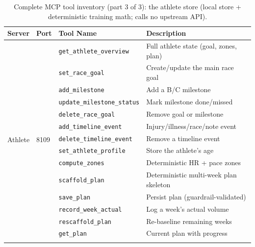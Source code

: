 \begin{table}[ht]
\begin{center}
\begin{minipage}{\textwidth}
\caption[Complete MCP tool inventory (3/3)]{Complete MCP tool inventory (part 3 of 3): the athlete store (local store + deterministic training math; calls no upstream API).}\label{tab:full_tools_c}
\begin{tabularx}{\textwidth}{lllX}
\toprule
\textbf{Server} & \textbf{Port} & \textbf{Tool Name} & \textbf{Description} \\
\midrule
\multirow{14}{*}{Athlete} & \multirow{14}{*}{8109}
  & \texttt{get\_athlete\_overview} & Full athlete state (goal, zones, plan) \\
  & & \texttt{set\_race\_goal} & Create/update the main race goal \\
  & & \texttt{add\_milestone} & Add a B/C milestone \\
  & & \texttt{update\_milestone\_status} & Mark milestone done/missed \\
  & & \texttt{delete\_race\_goal} & Remove goal or milestone \\
  & & \texttt{add\_timeline\_event} & Injury/illness/race/note event \\
  & & \texttt{delete\_timeline\_event} & Remove a timeline event \\
  & & \texttt{set\_athlete\_profile} & Store the athlete's age \\
  & & \texttt{compute\_zones} & Deterministic HR + pace zones \\
  & & \texttt{scaffold\_plan} & Deterministic multi-week plan skeleton \\
  & & \texttt{save\_plan} & Persist plan (guardrail-validated) \\
  & & \texttt{record\_week\_actual} & Log a week's actual volume \\
  & & \texttt{rescaffold\_plan} & Re-baseline remaining weeks \\
  & & \texttt{get\_plan} & Current plan with progress \\
\botrule
\end{tabularx}
\end{minipage}
\end{center}
\end{table}
